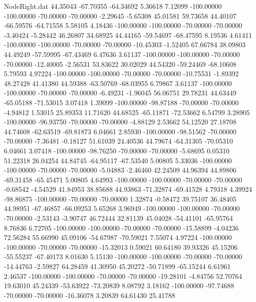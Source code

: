 \begin{filecontents}{NodeRight.dat}
  44.35043  -67.70355  -64.34692     5.36618    7.12099 -100.00000 -100.00000  -70.00000  -70.00000   -2.29645   -5.65308   45.01581   59.73658
  44.40107  -66.59576  -64.71558     5.58105    4.18436 -100.00000 -100.00000  -70.00000  -70.00000   -3.40424   -5.28442   46.26807   34.68925
  44.44165  -59.54697  -68.47595     8.19536    4.61411 -100.00000 -100.00000  -70.00000  -70.00000  -10.45303   -1.52405   67.66784   38.09803
  44.49249  -57.59995  -67.43469     6.47636    3.61137 -100.00000 -100.00000  -70.00000  -70.00000  -12.40005   -2.56531   53.83622   30.02029
  44.54320  -59.24469  -68.10608     5.79593    4.97224 -100.00000 -100.00000  -70.00000  -70.00000  -10.75531   -1.89392   48.27428   41.41380
  44.59388  -63.50769  -68.03955     6.79867    3.61137 -100.00000 -100.00000  -70.00000  -70.00000   -6.49231   -1.96045   56.06751   29.78231
  44.63449  -65.05188  -71.53015     3.07418    1.39099 -100.00000  -98.87188  -70.00000  -70.00000   -4.94812    1.53015   25.89353   11.71620
  44.68525  -65.11871  -72.53662     6.54799    3.28905 -100.00000  -96.93750  -70.00000  -70.00000   -4.88129    2.53662   54.12520   27.18708
  44.74608  -62.63519  -69.81873     6.04661    2.85930 -100.00000  -98.51562  -70.00000  -70.00000   -7.36481   -0.18127   51.61039   24.40536
  44.79674  -64.31305  -70.05310     6.04661    3.07418 -100.00000  -98.76250  -70.00000  -70.00000   -5.68695    0.05310   51.22318   26.04254
  44.84745  -64.95117  -67.53540     5.00805    5.33036 -100.00000 -100.00000  -70.00000  -70.00000   -5.04883   -2.46460   42.24509   44.96394
  44.89806  -69.31458  -65.45471     5.00805    4.64993 -100.00000 -100.00000  -70.00000  -70.00000   -0.68542   -4.54529   41.84953   38.85688
  44.93863  -71.32874  -69.41528     4.79318    4.39924  -98.86875 -100.00000  -70.00000  -70.00000    1.32874   -0.58472   39.75107   36.48405
  44.98951  -67.46857  -66.09253     5.65268    3.96949 -100.00000 -100.00000  -70.00000  -70.00000   -2.53143   -3.90747   46.72444   32.81139
  45.04028  -54.41101  -65.95764     8.76836    6.72705 -100.00000 -100.00000  -70.00000  -70.00000  -15.58899   -4.04236   72.56284   55.66990
  45.09106  -54.67987  -70.59021     7.55074    4.97224 -100.00000 -100.00000  -70.00000  -70.00000  -15.32013    0.59021   60.64180   39.93326
  45.15206  -55.55237  -67.40173     8.01630    5.15130 -100.00000 -100.00000  -70.00000  -70.00000  -14.44763   -2.59827   64.28459   41.30950
  45.20272  -50.71899  -65.15244     6.61961    2.46537 -100.00000 -100.00000  -70.00000  -70.00000  -19.28101   -4.84756   52.70764   19.63010
  45.24339  -53.63922  -73.20839     8.08792    3.18162 -100.00000  -97.74688  -70.00000  -70.00000  -16.36078    3.20839   64.61430   25.41788

\end{filecontents}
